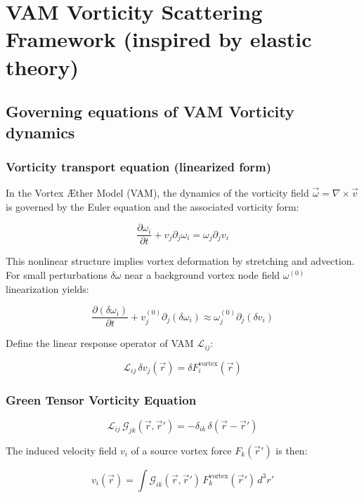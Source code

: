 \documentclass[preprint]{revtex4-2}
\begin{document}
\section{VAM Vorticity Scattering Framework (inspired by elastic theory)}

\subsection{Governing equations of VAM Vorticity dynamics}

\subsubsection*{Vorticity transport equation (linearized form)}

In the Vortex Æther Model (VAM), the dynamics of the vorticity field \(\vec{\omega} = \nabla \times \vec{v}\) is governed by the Euler equation and the associated vorticity form:

\[
    \frac{\partial \omega_i}{\partial t} + v_j \partial_j \omega_i = \omega_j \partial_j v_i
\]

This nonlinear structure implies vortex deformation by stretching and advection. For small perturbations \(\delta\omega\) near a background vortex node field \(\omega^{(0)}\) linearization yields:

\[
    \frac{\partial (\delta \omega_i)}{\partial t} + v_j^{(0)} \partial_j (\delta \omega_i) \approx \omega_j^{(0)} \partial_j (\delta v_i)
\]

Define the linear response operator of VAM \(\mathcal{L}_{ij}\):

\[
    \mathcal{L}_{ij} \, \delta v_j(\vec{r}) = \delta F_i^\text{vortex}(\vec{r})
\]

\subsubsection*{Green Tensor Vorticity Equation}

\[
    \mathcal{L}_{ij} \, \mathcal{G}_{jk}(\vec{r}, \vec{r}') = -\delta_{ik} \, \delta(\vec{r} - \vec{r}')
\]

The induced velocity field \(v_i\) of a source vortex force \(F_k(\vec{r}')\) is then:

\[
    v_i(\vec{r}) = \int \mathcal{G}_{ik}(\vec{r}, \vec{r}') \, F_k^\text{vortex}(\vec{r}') \, d^3 r'
\]
\end{document}
